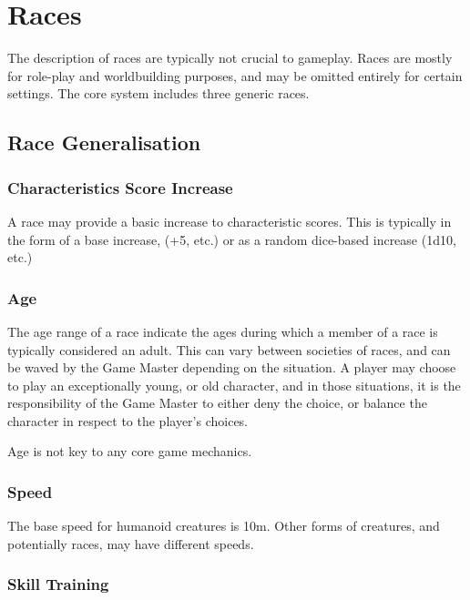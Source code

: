 \documentclass[]{article}
\date{}
\begin{document}
\section{Races}\label{races}

The description of races are typically not crucial to gameplay. Races
are mostly for role-play and worldbuilding purposes, and may be omitted
entirely for certain settings. The core system includes three generic
races.

\subsection{Race Generalisation}\label{race-generalisation}

\subsubsection{Characteristics Score
Increase}\label{characteristics-score-increase}

A race may provide a basic increase to characteristic scores. This is
typically in the form of a base increase, (+5, etc.) or as a random
dice-based increase (1d10, etc.)

\subsubsection{Age}\label{age}

The age range of a race indicate the ages during which a member of a
race is typically considered an adult. This can vary between societies
of races, and can be waved by the Game Master depending on the
situation. A player may choose to play an exceptionally young, or old
character, and in those situations, it is the responsibility of the Game
Master to either deny the choice, or balance the character in respect to
the player's choices.

Age is not key to any core game mechanics.

\subsubsection{Speed}\label{speed}

The base speed for humanoid creatures is 10m. Other forms of creatures,
and potentially races, may have different speeds.

\subsubsection{Skill Training}\label{skill-training}
\end{document}
